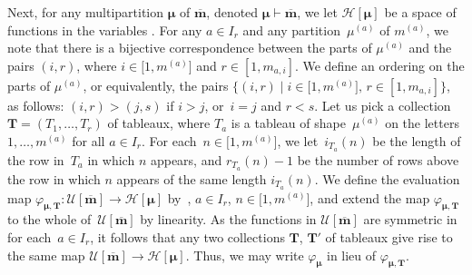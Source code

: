 \documentclass[10pt,a4paper]{amsart}
\numberwithin{equation}{section}
\begin{document}
Next, for any multipartition $\bm{\mu}$ of $\overline{\mathbf{m}}$, denoted $\bm{\mu}\vdash \overline{\mathbf{m}}$, we let $\mathcal{H}[\bm{\mu}]$ be a space of functions in the variables
.
For any $a\in I_r$ and any partition~$\mu^{(a)}$ of $m^{(a)}$, we note that there is a bijective correspondence between the parts of $\mu^{(a)}$ and the pairs $(i,r)$, where $i\in \bigl[1,m^{(a)}\bigr]$ and $r\in[1,m_{a,i}]$. We define an ordering on the parts of $\mu^{(a)}$, or equivalently, the pairs $\bigl\{(i,r)\mid i\in \bigl[1,m^{(a)}\bigr],\, r\in[1,m_{a,i}]\bigr\}$, as follows:
$
(i,r)>(j,s)$ if ${i>j}$, or~${ i=j}$ and $r<s$.
Let us pick a collection $\mathbf{T}=(T_1,\dots,T_r)$ of tableaux, where $T_a$ is a tableau of shape~$\mu^{(a)}$ on the letters $1,\dots,m^{(a)}$ for all $a\in I_r$. For each~${n\in\bigl[1,m^{(a)}\bigr]}$, we let~${i_{T_a}(n)}$ be the length of the row in~$T_a$ in which $n$ appears, and $r_{T_a}(n)-1$ be the number of rows above the row in which $n$ appears of the same length $i_{T_a}(n)$. We define the evaluation map ${\varphi_{\bm{\mu},\mathbf{T}}\colon \mathcal{U}[\overline{\mathbf{m}}]\to \mathcal{H}[\bm{\mu}]}$ by~, $ a\in I_r$, $n\in\bigl[1,m^{(a)}\bigr]$,
and extend the map $\varphi_{\bm{\mu},\mathbf{T}}$ to the whole of~$\mathcal{U}[\overline{\mathbf{m}}]$ by linearity. As the functions in $\mathcal{U}[\overline{ \mathbf{m}}]$ are symmetric in~ for each~${a\in I_r}$, it follows that any two collections $\mathbf{T}$, $\mathbf{T}'$ of tableaux give rise to the same map $\mathcal{U}[\overline{\mathbf{m}}] \to \mathcal{H}[\bm{\mu}]$. Thus, we may write $\varphi_{ \bm{\mu}}$ in lieu of $\varphi_{\bm{\mu},\mathbf{T}}$.
\end{document}
